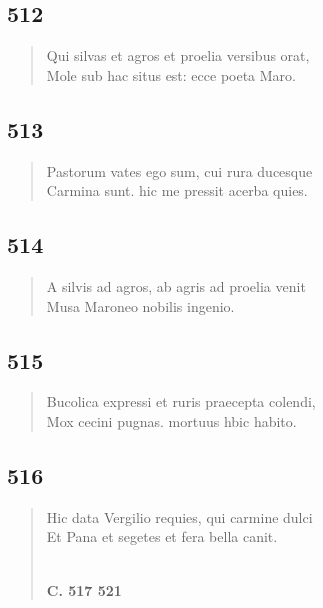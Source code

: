 \documentclass[11pt, a4paper]{report}
\begin{document}
            \subsection*{512}
      \begin{verse}
      Qui silvas et agros et proelia versibus orat, \\ Mole sub hac situs est: ecce poeta Maro. \\ 
      \end{verse}
  
            \subsection*{513}
      \begin{verse}
      Pastorum vates ego sum, cui rura ducesque \\ Carmina sunt. hic me pressit acerba quies. \\ 
      \end{verse}
  
            \subsection*{514}
      \begin{verse}
      A silvis ad agros, ab agris ad proelia venit \\ Musa Maroneo nobilis ingenio. \\ 
      \end{verse}
  
            \subsection*{515}
      \begin{verse}
      Bucolica expressi et ruris praecepta colendi, \\ Mox cecini pugnas. mortuus hbic habito. \\ 
      \end{verse}
  
            \subsection*{516}
      \begin{verse}
      Hic data Vergilio requies, qui carmine dulci \\ Et Pana et segetes et fera bella canit. \\ 
        ﻿\pagebreak 
     \marginpar{[64]} \begin{center} \textbf{C. 517 521} \end{center}
      \end{verse}
  
\end{document}
